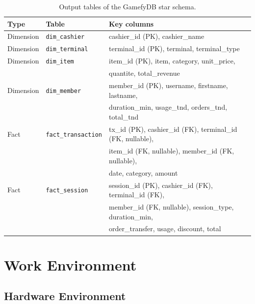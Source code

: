 \documentclass[12pt, a4paper]{report}
\begin{document}
\begin{table}[H]
  \centering
  \caption{Output tables of the GamefyDB star schema.\label{tab:star_schema}}
  \begin{tabular}{lll}
    \toprule
    \textbf{Type} & \textbf{Table} & \textbf{Key columns} \\
    \midrule
    Dimension & \texttt{dim\_cashier}  & cashier\_id (PK), cashier\_name \\
    Dimension & \texttt{dim\_terminal} & terminal\_id (PK), terminal, terminal\_type \\
    Dimension & \texttt{dim\_item}     & item\_id (PK), item, category, unit\_price, \\
              &                        & quantite, total\_revenue \\
    Dimension & \texttt{dim\_member}   & member\_id (PK), username, firstname, lastname, \\
              &                        & duration\_min, usage\_tnd, orders\_tnd, total\_tnd \\
    \midrule
    Fact & \texttt{fact\_transaction} & tx\_id (PK), cashier\_id (FK),
                                        terminal\_id (FK, nullable), \\
         &                            & item\_id (FK, nullable),
                                        member\_id (FK, nullable), \\
         &                            & date, category, amount \\
    Fact & \texttt{fact\_session}     & session\_id (PK), cashier\_id (FK),
                                        terminal\_id (FK), \\
         &                            & member\_id (FK, nullable),
                                        session\_type, duration\_min, \\
         &                            & order\_transfer, usage, discount, total \\
    \bottomrule
  \end{tabular}
\end{table}

\section{Work Environment}

\subsection{Hardware Environment}
\end{document}
